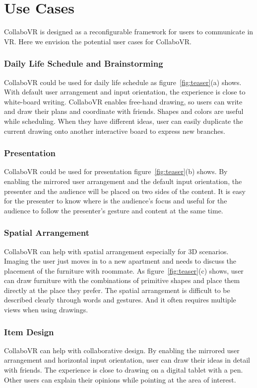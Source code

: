 \documentclass{sigchi}
\begin{document}
\section{Use Cases}
CollaboVR is designed as a reconfigurable framework for users to communicate in VR. Here we envision the potential user cases for CollaboVR.

\subsubsection{Daily Life Schedule and Brainstorming}
CollaboVR could be used for daily life schedule as figure~\ref{fig:teaser}(a) shows. With default user arrangement and input orientation, the experience is close to white-board writing. CollaboVR enables free-hand drawing, so users can write and draw their plans and coordinate with friends. Shapes and colors are useful while scheduling. When they have different ideas, user can easily duplicate the current drawing onto another interactive board to express new branches.

\subsubsection{Presentation}
CollaboVR could be used for presentation figure~\ref{fig:teaser}(b) shows. By enabling the mirrored user arrangement and the default input orientation, the presenter and the audience will be placed on two sides of the content. It is easy for the presenter to know where is the audience's focus and useful for the audience to follow the presenter's gesture and content at the same time.

\subsubsection{Spatial Arrangement}
CollaboVR can help with spatial arrangement especially for 3D scenarios. Imaging the user just moves in to a new apartment and needs to discuss the placement of the furniture with roommate. As figure~\ref{fig:teaser}(c) shows, user can draw furniture with the combinations of primitive shapes and place them directly at the place they prefer. The spatial arrangement is difficult to be described clearly through words and gestures. And it often requires multiple views when using drawings.

\subsubsection{Item Design}
CollaboVR can help with collaborative design. By enabling the mirrored user arrangement and horizontal input orientation, user can draw their ideas in detail with friends. The experience is close to drawing on a digital tablet with a pen. Other users can explain their opinions while pointing at the area of interest.
\end{document}
